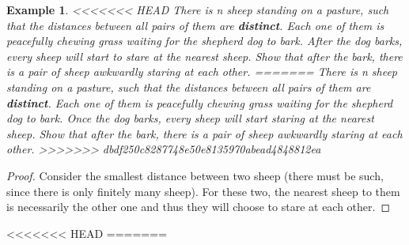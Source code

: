 \documentclass{article}
\newtheorem{theorem}{Example}
\begin{document}
\begin{theorem}
<<<<<<< HEAD
There is n sheep standing on a pasture, such that the distances between all pairs of them are \textbf{distinct}. Each one of them is peacefully chewing grass waiting for the shepherd dog to bark. After the dog barks, every sheep will start to stare at the nearest sheep. Show that after the bark, there is a pair of sheep awkwardly staring at each other. 
=======
There is n sheep standing on a pasture, such that the distances between all pairs of them are \textbf{distinct}. Each one of them is peacefully chewing grass waiting for the shepherd dog to bark. Once the dog barks, every sheep will start staring at the nearest sheep. Show that after the bark, there is a pair of sheep awkwardly staring at each other.
>>>>>>> dbdf250c8287748e50e8135970abead4848812ea
\end{theorem}

\begin{proof}
Consider the smallest distance between two sheep (there must be such, since there is only finitely many sheep). For these two, the nearest sheep to them is necessarily the other one and thus they will choose to stare at each other.
\end{proof}


<<<<<<< HEAD
=======
\end{document}
